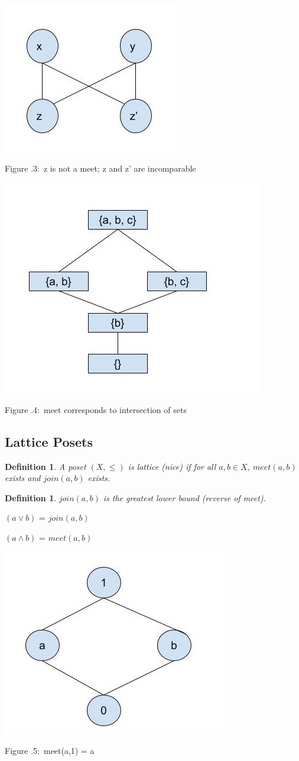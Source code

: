 \documentclass[twoside]{article}
\newcounter{lecnum}
\newcommand{\fig}[3]{
			\vspace{#2}
			\begin{center}
			Figure \thelecnum.#1:~#3
			\end{center}
	}
\newtheorem{definition}[theorem]{Definition}
\begin{document}
\begin{minipage}[]{\textwidth}
\centering
\includegraphics[width=.5\textwidth]{incomparable.jpg}
\end{minipage}
\fig{3}{0cm}{z is not a meet; z and z' are incomparable}

\begin{minipage}[]{\textwidth}
\centering
\includegraphics[width=.5\textwidth]{meet_intersection.jpg}
\end{minipage}
\fig{4}{0cm}{meet corresponds to intersection of sets}

\subsection{Lattice Posets}
\begin{definition}
A poset $(X, \leq)$ is lattice (nice) if for all $a,b \in X$, $meet(a, b)$ exists and $join(a,b)$ exists.
\end{definition}

\begin{definition}
$join(a,b)$ is the greatest lower bound (reverse of meet).
\end{definition}

$(a \vee b)$ = $join(a,b)$

$(a \wedge b)$ = $meet(a,b)$


\begin{minipage}[]{\textwidth}
\centering
\includegraphics[width=.5\textwidth]{lattice1.jpg}
\end{minipage}
\fig{5}{0cm}{meet(a,1) = a}
\end{document}
